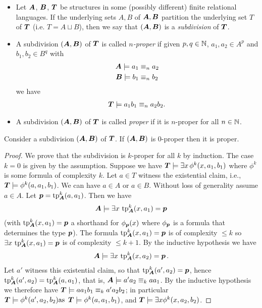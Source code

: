 \documentclass{amsart}
\DeclareMathOperator{\TT}{\boldface T}
\DeclareMathOperator{\A}{\boldface A}
\DeclareMathOperator{\B}{\boldface B}
\begin{document}
\begin{Definition}
  \begin{itemize}
  \item Let $\A$, $\B$, $\TT$ be structures in some (possibly different) finite relational languages. If the underlying sets $A, B$ of $\A, \B$ partition the underlying set $T$ of $\TT$ (i.e. $T = A \sqcup B$), then we say that $(\A, \B)$ is a \emph{subdivision} of $\TT$.
  \item A subdivision $(\A, \B)$ of $\TT$ is called \emph{$n$-proper} if given $p,q \in \mathbb{N}$,  $a_1, a_2 \in A^p$ and $b_1, b_2 \in B^q$ with
    \begin{align*}
      \A \models a_1 &\equiv_n a_2 \\
      \B \models b_1 &\equiv_n b_2
    \end{align*}
    we have
    \begin{align*}
      \TT \models a_1b_1 \equiv_n a_2b_2.
    \end{align*}
  \item A subdivision $(\A, \B)$ of $\TT$ is called \emph{proper} if it is $n$-proper for all $n \in \mathbb{N}$.
  \end{itemize}
\end{Definition}

\begin{Lemma} \label{lm_subdivision}
	Consider a subdivision $(\A, \B)$ of $\TT$. If $(\A, \B)$ is $0$-proper then it is proper.
\end{Lemma}

\begin{proof}
	We prove that the subdivision is $k$-proper for all $k$ by induction.
        The case $k = 0$ is given by the assumption.
        Suppose we have $\TT \models \exists x \, \phi^k(x, a_1, b_1)$ where $\phi^k$ is some formula of complexity $k$. Let $a \in T$ witness the existential claim, i.e., $\TT \models \phi^k(a, a_1, b_1)$. We can have $a \in A$ or $a \in B$. Without loss of generality assume $a \in A$. Let $\pp = \tp^k_{\A} (a, a_1)$. Then we have 
	\begin{align*}
          \A \models \exists x \, \tp^k_{\A}(x, a_1) = \pp
	\end{align*}
        (with $\tp^k_{\A}(x, a_1) = \pp$ a shorthand for $\phi_{\operatorname{\boldsymbol p}}(x)$ where $\phi_{\operatorname{\boldsymbol p}}$ is a formula that determines the type $\operatorname{\boldsymbol p}$).
	The formula $\tp^k_{\A}(x, a_1) = \pp$ is of complexity $\leq k$ so $\exists x \, \tp^k_{\A}(x, a_1) = \pp$ is of complexity $\leq k+1$. By the inductive hypothesis we have
	\begin{align*}
		\A \models \exists x \, \tp^k_{\A}(x, a_2) = \pp.
	\end{align*}
	Let $a'$ witness this existential claim, so that $\tp^k_{\A}(a', a_2) = \pp$, hence $\tp^k_{\A}(a', a_2) = \tp^k_{\A}(a, a_1)$, that is,
        $\A \models a'a_2 \equiv_k aa_1$. By the inductive hypothesis we therefore have
        $\TT \models aa_1b_1 \equiv_k a'a_2b_2$; in particular $\TT \models \phi^k(a', a_2, b_2)  \text {as } \TT \models \phi^k(a, a_1, b_1)$,
        and $\TT \models \exists x \phi^k(x, a_2, b_2)$.
\end{proof}
\end{document}
